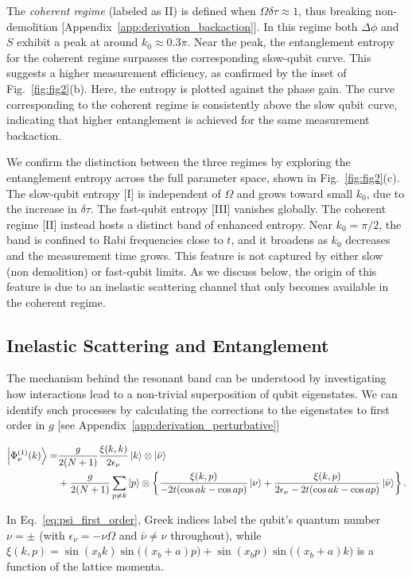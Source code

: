\documentclass[10pt,
 amsmath,amssymb,
 aps,prb, twocolumn
]{revtex4-2}
\begin{document}
The \textit{coherent regime} (labeled as II) is defined when $\Omega\delta\tau \approx 1$, thus breaking non-demolition [Appendix~\ref{app:derivation_backaction}]. In this regime both $\Delta\phi$ and $S$ exhibit a peak at around $k_0 \approx 0.3\pi$. Near the peak, the entanglement entropy for the coherent regime surpasses the corresponding slow-qubit curve. This suggests a higher measurement efficiency, as confirmed by the inset of Fig.~\ref{fig:fig2}(b). Here, the entropy is plotted against the phase gain. The curve corresponding to the coherent regime is consistently above the slow qubit curve, indicating that higher entanglement is achieved for the same measurement backaction.

We confirm the distinction between the three regimes by exploring the entanglement entropy across the full parameter space, shown in Fig.~\ref{fig:fig2}(c). The slow-qubit entropy [I] is independent of $\Omega$ and grows toward small $k_0$, due to the increase in \mbox{$\delta \tau$}. The fast-qubit entropy [III] vanishes globally. The coherent regime [II] instead hosts a distinct band of enhanced entropy. Near $k_0 = \pi/2$, the band is confined to Rabi frequencies close to $t$, and it broadens as $k_0$ decreases and the measurement time grows. This feature is not captured by either slow (non demolition) or fast-qubit limits. As we discuss below, the origin of this feature is due to an inelastic scattering channel that only becomes available in the coherent regime.

\subsection{Inelastic Scattering and Entanglement}\label{sect:entanglement}

The mechanism behind the resonant band can be understood by investigating how interactions lead to a non-trivial superposition of qubit eigenstates. We can identify such processes by calculating the corrections to the eigenstates to first order in \mbox{$g$} [see Appendix~\ref{app:derivation_perturbative}]
\begin{widetext}
\begin{align}
    \ket{\Phi_\nu^{(1)} (k)} = &  \frac{g}{2(N+1)} \frac{\xi(k,k)}{2\epsilon_\nu} \ket{k} \otimes \ket{\bar{\nu}} \nonumber \\
    & +\frac{g}{2(N+1)} \sum_{p \neq k} \ket{p} \otimes \left\{\frac{\xi(k,p)}{-2t(\cos ak - \cos ap)} \ket{\nu} + \frac{\xi(k,p)}{2\epsilon_\nu - 2t(\cos ak - \cos ap)} \ket{\bar{\nu}} \right\}. \label{eq:psi_first_order}
\end{align}
\end{widetext}
In Eq.~\eqref{eq:psi_first_order}, Greek indices label the qubit's quantum number \mbox{$\nu=\pm$} (with \mbox{$\epsilon_\nu=-\nu\Omega$} and \mbox{$\bar{\nu}\neq\nu$} throughout), while \mbox{$\xi(k,p)=\sin(x_b k)\sin\!\big((x_b+a)p\big)+\sin(x_b p)\sin\!\big((x_b+a)k\big)$} is a function of the lattice momenta.
\end{document}
